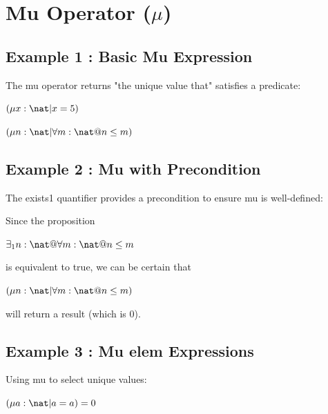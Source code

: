 \documentclass[a4paper,10pt,fleqn]{article}
\begin{document}
\section*{Mu Operator (\ensuremath{\mu})}

\subsection*{Example 1 : Basic Mu Expression}

\noindent The mu operator returns "the unique value that" satisfies a predicate:

\bigskip

\noindent
$(\mu x : \nat | x = 5)$


\noindent
$(\mu n : \nat | \forall m : \nat @ n \leq m)$


\subsection*{Example 2 : Mu with Precondition}

\noindent The exists1 quantifier provides a precondition to ensure mu is well-defined:

\bigskip

\noindent Since the proposition

\bigskip

\noindent
$\exists_1 n : \nat @ \forall m : \nat @ n \leq m$


\noindent is equivalent to true, we can be certain that

\bigskip

\noindent
$(\mu n : \nat | \forall m : \nat @ n \leq m)$


\noindent will return a result (which is 0).

\bigskip

\subsection*{Example 3 : Mu elem Expressions}

\noindent Using mu to select unique values:

\bigskip

\noindent
$(\mu a : \nat | a = a) = 0$
\end{document}
